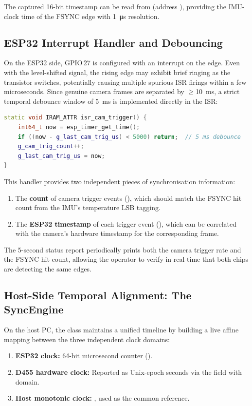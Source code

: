 The captured 16-bit timestamp can be read from  (address ), providing the IMU-clock time of the FSYNC edge with \SI{1}{\micro\second} resolution.


\subsection{ESP32 Interrupt Handler and Debouncing}

On the ESP32 side, GPIO\,27 is configured with an interrupt on the  edge.
Even with the level-shifted signal, the rising edge may exhibit brief ringing as the transistor switches, potentially causing multiple spurious ISR firings within a few microseconds.
Since genuine camera frames are separated by $\geq$\SI{10}{\milli\second}, a strict temporal debounce window of \SI{5}{\milli\second} is implemented directly in the ISR:

\begin{lstlisting}[language=C++, caption={Camera trigger ISR with debounce logic.}, label={lst:isr_debounce}]
static void IRAM_ATTR isr_cam_trigger() {
    int64_t now = esp_timer_get_time();
    if ((now - g_last_cam_trig_us) < 5000) return;  // 5 ms debounce
    g_cam_trig_count++;
    g_last_cam_trig_us = now;
}
\end{lstlisting}

This handler provides two independent pieces of synchronisation information:
\begin{enumerate}[nosep]
  \item The \textbf{count} of camera trigger events (), which should match the FSYNC hit count from the IMU's temperature LSB tagging.
  \item The \textbf{ESP32 timestamp} of each trigger event (), which can be correlated with the camera's hardware timestamp for the corresponding frame.
\end{enumerate}

The 5-second status report periodically prints both the camera trigger rate and the FSYNC hit count, allowing the operator to verify in real-time that both chips are detecting the same edges.


\subsection{Host-Side Temporal Alignment: The SyncEngine}\label{sec:sync_engine}

On the host PC, the  class maintains a unified timeline by building a live affine mapping between the three independent clock domains:
\begin{enumerate}[nosep]
  \item \textbf{ESP32 clock:} 64-bit microsecond counter ().
  \item \textbf{D455 hardware clock:} Reported as Unix-epoch seconds via the  field with  domain.
  \item \textbf{Host monotonic clock:} , used as the common reference.
\end{enumerate}

